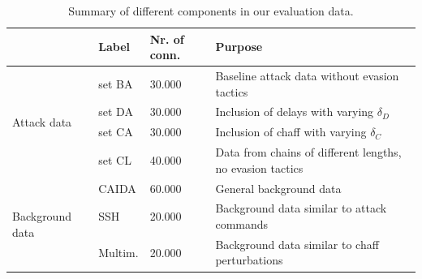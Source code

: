 \documentclass[runningheads,11pt]{llncs}\usepackage[]{graphicx}\usepackage[]{color}
\begin{document}


\begin{table}
\centering
\begin{tabular}{l|l|l|l}
& Label  &Nr. of conn. & Purpose\\ \hline
\multirow{4}{*}{Attack data}& set BA & 30.000& Baseline attack data without evasion tactics \\ \cline{2-4}
						& set DA & 30.000& Inclusion of delays with varying $\delta_D$ \\ \cline{2-4}
						& set CA & 30.000& Inclusion of chaff with varying $\delta_C$ \\ \cline{2-4}
						& set CL & 40.000& Data from chains of different lengths,  no evasion tactics \\ \hline
\multirow{3}{*}{Background data}&CAIDA & 60.000& General background data \\ \cline{2-4}
							&SSH & 20.000& Background data similar to attack commands \\ \cline{2-4}
							&Multim.& 20.000& Background data similar to chaff perturbations \\ \hline
\end{tabular}
\caption{Summary of different components in our evaluation data.}\label{Fig:Datasim}
\vspace{-0.6cm}
\end{table}
\end{document}
